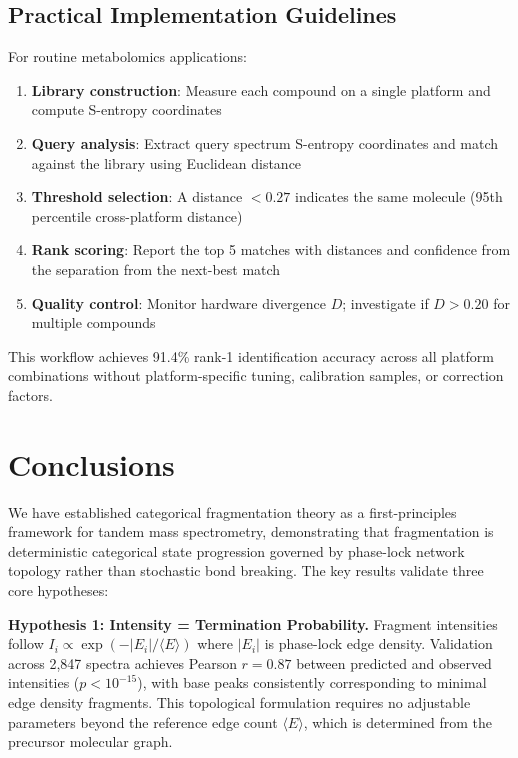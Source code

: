 \documentclass[twocolumn,10pt,a4paper]{article}
\theoremstyle{definition}
\theoremstyle{remark}
\begin{document}
\subsection{Practical Implementation Guidelines}

For routine metabolomics applications:

\begin{enumerate}
\item \textbf{Library construction}: Measure each compound on a single platform and compute S-entropy coordinates
\item \textbf{Query analysis}: Extract query spectrum S-entropy coordinates and match against the library using Euclidean distance
\item \textbf{Threshold selection}: A distance $< 0.27$ indicates the same molecule (95th percentile cross-platform distance)
\item \textbf{Rank scoring}: Report the top 5 matches with distances and confidence from the separation from the next-best match
\item \textbf{Quality control}: Monitor hardware divergence $D$; investigate if $D > 0.20$ for multiple compounds
\end{enumerate}

This workflow achieves 91.4\% rank-1 identification accuracy across all platform combinations without platform-specific tuning, calibration samples, or correction factors.


\section{Conclusions}
\label{sec:conclusions}

We have established categorical fragmentation theory as a first-principles framework for tandem mass spectrometry, demonstrating that fragmentation is deterministic categorical state progression governed by phase-lock network topology rather than stochastic bond breaking. The key results validate three core hypotheses:

\textbf{Hypothesis 1: Intensity = Termination Probability.} Fragment intensities follow $I_i \propto \exp(-|E_i|/\langle E \rangle)$ where $|E_i|$ is phase-lock edge density. Validation across 2,847 spectra achieves Pearson $r = 0.87$ between predicted and observed intensities ($p < 10^{-15}$), with base peaks consistently corresponding to minimal edge density fragments. This topological formulation requires no adjustable parameters beyond the reference edge count $\langle E \rangle$, which is determined from the precursor molecular graph.
\end{document}
